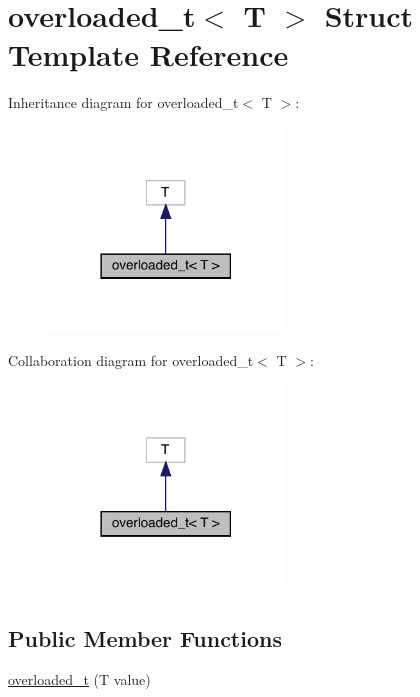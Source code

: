 \hypertarget{structoverloaded__t_3_01_t_01_4}{}\section{overloaded\+\_\+t$<$ T $>$ Struct Template Reference}
\label{structoverloaded__t_3_01_t_01_4}


Inheritance diagram for overloaded\+\_\+t$<$ T $>$\+:
\nopagebreak
\begin{figure}[H]
\begin{center}
\leavevmode
\includegraphics[width=177pt]{structoverloaded__t_3_01_t_01_4__inherit__graph}
\end{center}
\end{figure}


Collaboration diagram for overloaded\+\_\+t$<$ T $>$\+:
\nopagebreak
\begin{figure}[H]
\begin{center}
\leavevmode
\includegraphics[width=177pt]{structoverloaded__t_3_01_t_01_4__coll__graph}
\end{center}
\end{figure}
\subsection*{Public Member Functions}
\begin{DoxyCompactItemize}
\item 
\hyperlink{structoverloaded__t_3_01_t_01_4_a4261ae456540b95220a261d78315bcc9}{overloaded\+\_\+t} (T value)
\end{DoxyCompactItemize}


